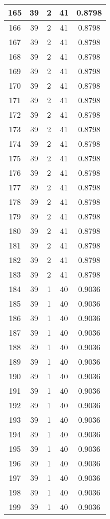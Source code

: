 \documentclass[letterpaper, 12pt]{article}
\begin{document}
\begin{longtable}{|c|c|c|c|c|}
\hline
165 & 39 & 2 & 41 & 0.8798 \\
\hline
166 & 39 & 2 & 41 & 0.8798 \\
\hline
167 & 39 & 2 & 41 & 0.8798 \\
\hline
168 & 39 & 2 & 41 & 0.8798 \\
\hline
169 & 39 & 2 & 41 & 0.8798 \\
\hline
170 & 39 & 2 & 41 & 0.8798 \\
\hline
171 & 39 & 2 & 41 & 0.8798 \\
\hline
172 & 39 & 2 & 41 & 0.8798 \\
\hline
173 & 39 & 2 & 41 & 0.8798 \\
\hline
174 & 39 & 2 & 41 & 0.8798 \\
\hline
175 & 39 & 2 & 41 & 0.8798 \\
\hline
176 & 39 & 2 & 41 & 0.8798 \\
\hline
177 & 39 & 2 & 41 & 0.8798 \\
\hline
178 & 39 & 2 & 41 & 0.8798 \\
\hline
179 & 39 & 2 & 41 & 0.8798 \\
\hline
180 & 39 & 2 & 41 & 0.8798 \\
\hline
181 & 39 & 2 & 41 & 0.8798 \\
\hline
182 & 39 & 2 & 41 & 0.8798 \\
\hline
183 & 39 & 2 & 41 & 0.8798 \\
\hline
184 & 39 & 1 & 40 & 0.9036 \\
\hline
185 & 39 & 1 & 40 & 0.9036 \\
\hline
186 & 39 & 1 & 40 & 0.9036 \\
\hline
187 & 39 & 1 & 40 & 0.9036 \\
\hline
188 & 39 & 1 & 40 & 0.9036 \\
\hline
189 & 39 & 1 & 40 & 0.9036 \\
\hline
190 & 39 & 1 & 40 & 0.9036 \\
\hline
191 & 39 & 1 & 40 & 0.9036 \\
\hline
192 & 39 & 1 & 40 & 0.9036 \\
\hline
193 & 39 & 1 & 40 & 0.9036 \\
\hline
194 & 39 & 1 & 40 & 0.9036 \\
\hline
195 & 39 & 1 & 40 & 0.9036 \\
\hline
196 & 39 & 1 & 40 & 0.9036 \\
\hline
197 & 39 & 1 & 40 & 0.9036 \\
\hline
198 & 39 & 1 & 40 & 0.9036 \\
\hline
199 & 39 & 1 & 40 & 0.9036 \\
\hline
\end{longtable}
\end{document}

